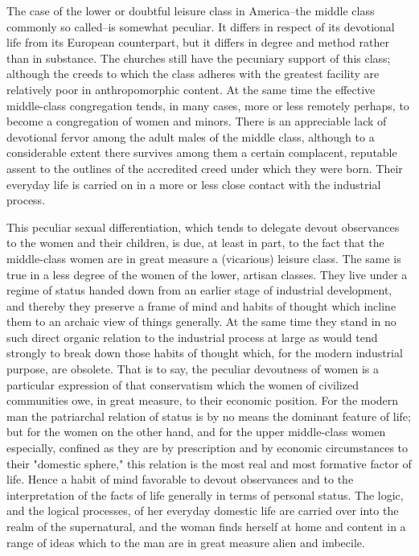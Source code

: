 \documentclass[12pt]{report}
\begin{document}
The case of the lower or doubtful leisure class in America--the middle
class commonly so called--is somewhat peculiar. It differs in respect
of its devotional life from its European counterpart, but it differs in
degree and method rather than in substance. The churches still have the
pecuniary support of this class; although the creeds to which the
class adheres with the greatest facility are relatively poor in
anthropomorphic content. At the same time the effective middle-class
congregation tends, in many cases, more or less remotely perhaps, to
become a congregation of women and minors. There is an appreciable lack
of devotional fervor among the adult males of the middle class, although
to a considerable extent there survives among them a certain complacent,
reputable assent to the outlines of the accredited creed under which
they were born. Their everyday life is carried on in a more or less
close contact with the industrial process.

This peculiar sexual differentiation, which tends to delegate devout
observances to the women and their children, is due, at least in
part, to the fact that the middle-class women are in great measure a
(vicarious) leisure class. The same is true in a less degree of the
women of the lower, artisan classes. They live under a regime of status
handed down from an earlier stage of industrial development, and thereby
they preserve a frame of mind and habits of thought which incline them
to an archaic view of things generally. At the same time they stand in
no such direct organic relation to the industrial process at large as
would tend strongly to break down those habits of thought which, for the
modern industrial purpose, are obsolete. That is to say, the peculiar
devoutness of women is a particular expression of that conservatism
which the women of civilized communities owe, in great measure, to their
economic position. For the modern man the patriarchal relation of status
is by no means the dominant feature of life; but for the women on the
other hand, and for the upper middle-class women especially, confined
as they are by prescription and by economic circumstances to their
"domestic sphere," this relation is the most real and most formative
factor of life. Hence a habit of mind favorable to devout observances
and to the interpretation of the facts of life generally in terms of
personal status. The logic, and the logical processes, of her everyday
domestic life are carried over into the realm of the supernatural, and
the woman finds herself at home and content in a range of ideas which to
the man are in great measure alien and imbecile.
\end{document}
